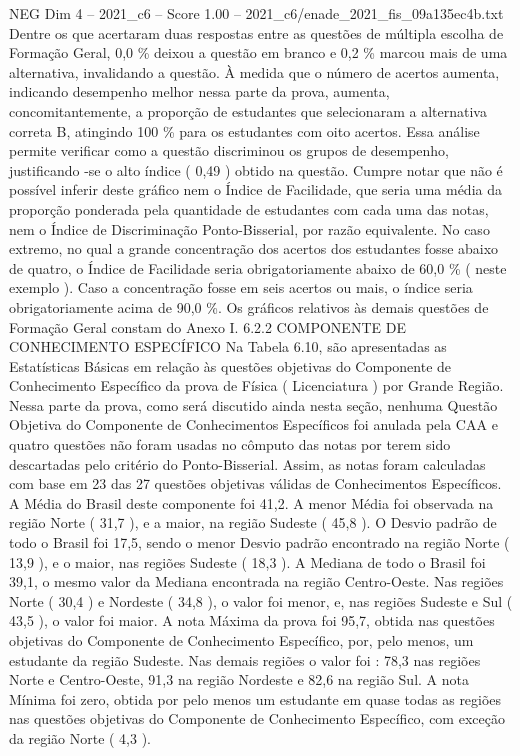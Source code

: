 \begin{textsample}{NEG Dim 4 – 2021\_c6 – Score 1.00 – 2021\_c6/enade\_2021\_fis\_09a135ec4b.txt}
Dentre os que acertaram duas respostas entre as questões de múltipla escolha de Formação Geral, 0,0 \% deixou a questão em branco e 0,2 \% marcou mais de uma alternativa, invalidando a questão.
À medida que o número de acertos aumenta, indicando desempenho melhor nessa parte da prova, aumenta, concomitantemente, a proporção de estudantes que selecionaram a alternativa correta B, atingindo 100 \% para os estudantes com oito acertos.
Essa análise permite verificar como a questão discriminou os grupos de desempenho, justificando -se o alto índice ( 0,49 ) obtido na questão.
Cumpre notar que não é possível inferir deste gráfico nem o Índice de Facilidade, que seria uma média da proporção ponderada pela quantidade de estudantes com cada uma das notas, nem o Índice de Discriminação Ponto-Bisserial, por razão equivalente.
No caso extremo, no qual a grande concentração dos acertos dos estudantes fosse abaixo de quatro, o Índice de Facilidade seria obrigatoriamente abaixo de 60,0 \% ( neste exemplo ).
Caso a concentração fosse em seis acertos ou mais, o índice seria obrigatoriamente acima de 90,0 \%.
Os gráficos relativos às demais questões de Formação Geral constam do Anexo I. 6.2.2 COMPONENTE DE CONHECIMENTO ESPECÍFICO Na Tabela 6.10, são apresentadas as Estatísticas Básicas em relação às questões objetivas do Componente de Conhecimento Específico da prova de Física ( Licenciatura ) por Grande Região.
Nessa parte da prova, como será discutido ainda nesta seção, nenhuma Questão Objetiva do Componente de Conhecimentos Específicos foi anulada pela CAA e quatro questões não foram usadas no cômputo das notas por terem sido descartadas pelo critério do Ponto-Bisserial.
Assim, as notas foram calculadas com base em 23 das 27 questões objetivas válidas de Conhecimentos Específicos.
A Média do Brasil deste componente foi 41,2.
A menor Média foi observada na região Norte ( 31,7 ), e a maior, na região Sudeste ( 45,8 ).
O Desvio padrão de todo o Brasil foi 17,5, sendo o menor Desvio padrão encontrado na região Norte ( 13,9 ), e o maior, nas regiões Sudeste ( 18,3 ).
A Mediana de todo o Brasil foi 39,1, o mesmo valor da Mediana encontrada na região Centro-Oeste.
Nas regiões Norte ( 30,4 ) e Nordeste ( 34,8 ), o valor foi menor, e, nas regiões Sudeste e Sul ( 43,5 ), o valor foi maior.
A nota Máxima da prova foi 95,7, obtida nas questões objetivas do Componente de Conhecimento Específico, por, pelo menos, um estudante da região Sudeste.
Nas demais regiões o valor foi : 78,3 nas regiões Norte e Centro-Oeste, 91,3 na região Nordeste e 82,6 na região Sul.
A nota Mínima foi zero, obtida por pelo menos um estudante em quase todas as regiões nas questões objetivas do Componente de Conhecimento Específico, com exceção da região Norte ( 4,3 ).

\end{textsample}
